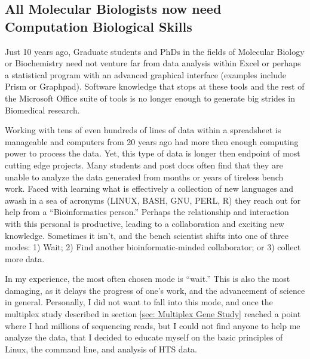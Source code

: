 
  \subsection{All Molecular Biologists now need Computation Biological Skills}

    Just 10 years ago,  Graduate students and PhDs in the fields of Molecular Biology or Biochemistry need not venture far from data analysis within Excel or perhaps a statistical program with an advanced graphical interface (examples include Prism or Graphpad). Software knowledge that stops at these tools and the rest of the Microsoft Office suite of tools is no longer enough to generate big strides in Biomedical research.

   Working with tens of even hundreds of lines of data within a spreadsheet is manageable and computers from 20 years ago had more then enough computing power to process the data. Yet, this type of data is longer then endpoint of most cutting edge projects. Many students and post docs often find that they are unable to analyze the data generated from months or years of tireless bench work. Faced with learning what is effectively a collection of new languages and awash in a sea of acronyms (LINUX, BASH, GNU, PERL, R) they reach out for help from a ``Bioinformatics person.'' Perhaps the relationship and interaction with this personal is productive, leading to a collaboration and exciting new knowledge. Sometimes it isn't, and the bench scientist shifts into one of three modes: 1) Wait; 2) Find another bioinformatic-minded collaborator; or 3) collect more data.

    In my experience, the most often chosen mode is ``wait.'' This is also the most damaging, as it delays the progress of one's work, and the advancement of science in general. Personally, I did not want to fall into this mode, and once the multiplex study described in section \ref{sec: Multiplex Gene Study} reached a point where I had millions of sequencing reads, but I could not find anyone to help me analyze the data, that I decided to educate myself on the basic principles of Linux, the command line, and analysis of HTS data.

